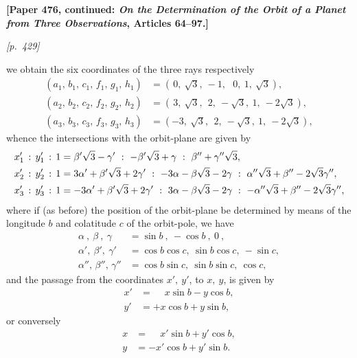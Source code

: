 \documentclass[11pt]{article}
\begin{document}

\noindent\textbf{[Paper 476, continued: \textit{On the Determination of the Orbit of a Planet from Three Observations}, Articles 64--97.]}

\medskip

\noindent\textit{[p.~429]}

\smallskip

we obtain the six coordinates of the three rays respectively
\[
\begin{aligned}
(a_{1},\, b_{1},\, c_{1},\, f_{1},\, g_{1},\, h_{1}) &= (\, 0,\ \sqrt{3},\ -1,\ \ \ 0,\ 1,\ \sqrt{3}),\\
(a_{2},\, b_{2},\, c_{2},\, f_{2},\, g_{2},\, h_{2}) &= (\, 3,\ \sqrt{3},\ \ 2,\ -\sqrt{3},\ 1,\ -2\sqrt{3}),\\
(a_{3},\, b_{3},\, c_{3},\, f_{3},\, g_{3},\, h_{3}) &= (-3,\ \sqrt{3},\ \ 2,\ -\sqrt{3},\ 1,\ -2\sqrt{3}),
\end{aligned}
\]
whence the intersections with the orbit-plane are given by
\[
\resizebox{\textwidth}{!}{$\displaystyle
\begin{aligned}
x_{1}'\,:\,y_{1}'\,:\,1 &= \beta'\sqrt{3}-\gamma'\ :\ -\beta'\sqrt{3}+\gamma\ :\ \beta'' + \gamma''\sqrt{3},\\
x_{2}'\,:\,y_{2}'\,:\,1 &= 3\alpha' + \beta'\sqrt{3} + 2\gamma'\ :\ -3\alpha - \beta\sqrt{3} - 2\gamma\ :\ \alpha''\sqrt{3} + \beta'' - 2\sqrt{3}\gamma'',\\
x_{3}'\,:\,y_{3}'\,:\,1 &= -3\alpha' + \beta'\sqrt{3} + 2\gamma'\ :\ 3\alpha - \beta\sqrt{3} - 2\gamma\ :\ -\alpha''\sqrt{3} + \beta'' - 2\sqrt{3}\gamma'',
\end{aligned}$}
\]
where if (as before) the position of the orbit-plane be determined by means of the longitude $b$ and colatitude $c$ of the orbit-pole, we have
\[
\begin{aligned}
\alpha\ ,\ \beta\ ,\ \gamma &= \sin b\ ,\ -\cos b\ ,\ 0\ ,\\
\alpha',\ \beta',\ \gamma' &= \cos b\cos c,\ \sin b\cos c,\ -\sin c,\\
\alpha'',\, \beta'',\, \gamma'' &= \cos b\sin c,\ \sin b\sin c,\ \cos c,
\end{aligned}
\]
and the passage from the coordinates $x',\ y'$, to $x,\ y$, is given by
\[
\begin{aligned}
x' &= \phantom{+}x\sin b - y\cos b,\\
y' &= +x\cos b + y\sin b,
\end{aligned}
\]
or conversely
\[
\begin{aligned}
x &= \phantom{+}x'\sin b + y'\cos b,\\
y &= -x'\cos b + y'\sin b.
\end{aligned}
\]
\end{document}
